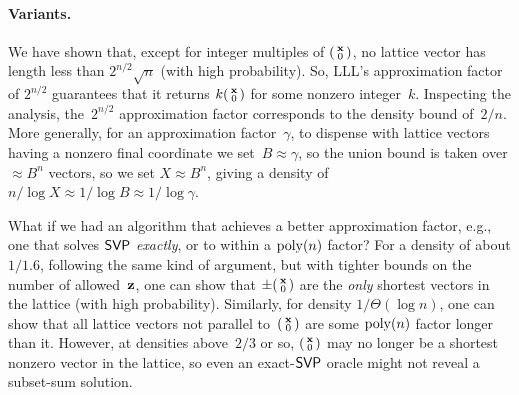 \documentclass[11pt]{article}
\begin{document}
\paragraph{Variants.}

We have shown that, except for integer multiples of
$\left(\begin{smallmatrix}\mathbf{x} \\ 0\end{smallmatrix}\right)$, no lattice vector has length less than
$2^{n/2} \sqrt{n}$ (with high probability). So, LLL's approximation
factor of $2^{n/2}$ guarantees that it returns $k \smlmat{\vecx \\ 0}$
for some nonzero integer~$k$. Inspecting the analysis, the~$2^{n/2}$
approximation factor corresponds to the density bound of~$2/n$. More
generally, for an approximation factor~$\gamma$, to dispense with
lattice vectors having a nonzero final coordinate we
set~$B \approx \gamma$, so the union bound is taken over
$\approx B^{n}$ vectors, so we set $X \approx B^{n}$, giving a density
of $n/\log X \approx 1/\log B \approx 1/\log \gamma$.

What if we had an algorithm that achieves a better approximation
factor, e.g., one that solves $\mathsf{SVP}$ \emph{exactly}, or to within a
$\operatorname{poly}(n)$ factor? For a density of about $1/1.6$, following the same
kind of argument, but with tighter bounds on the number of
allowed~$\mathbf{z}$, one can show that $\pm \smlmat{\vecx \\ 0}$ are the
\emph{only} shortest vectors in the lattice (with high probability).
Similarly, for density $1/\Theta(\log n)$, one can show that all
lattice vectors not parallel to~$\left(\begin{smallmatrix}\mathbf{x} \\ 0\end{smallmatrix}\right)$ are some
$\operatorname{poly}(n)$ factor longer than it. However, at densities above~$2/3$ or
so, $\left(\begin{smallmatrix}\mathbf{x} \\ 0\end{smallmatrix}\right)$ may no longer be a shortest nonzero vector
in the lattice, so even an exact-$\mathsf{SVP}$ oracle might not reveal a
subset-sum solution.
    


\end{document}
